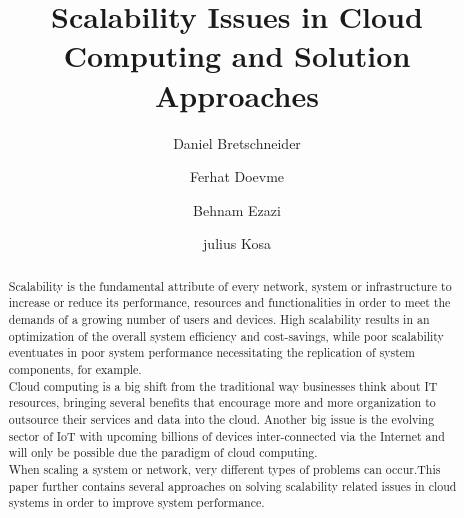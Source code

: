 \documentclass[sigconf]{acmart}
\begin{document}
\title{Scalability Issues in Cloud Computing and  Solution Approaches}

\author{Daniel Bretschneider}

\author{Ferhat Doevme}

\author{Behnam Ezazi}

\author{julius Kosa}


\renewcommand{\shortauthors}{}

\begin{abstract}
Scalability is the fundamental attribute of every network,
system or infrastructure to increase or reduce its
performance, resources and functionalities in order to meet
the demands of a growing number of users and devices. High
scalability results in an optimization of the overall system
efficiency and cost-savings, while poor scalability eventuates
in poor system performance necessitating the replication of
system components, for example.\\

Cloud computing is a big shift from the traditional way
businesses think about IT resources, bringing several
benefits that encourage more and more organization to
outsource their services and data into the cloud. Another big
issue is the evolving sector of IoT with upcoming billions of
devices inter-connected via the Internet and will only be
possible due the paradigm of cloud computing.\\

When scaling a system or network, very different types of
problems can occur.This paper further contains several approaches 
on solving scalability related issues in cloud systems in order to
improve system performance.
\end{abstract}
\end{document}
